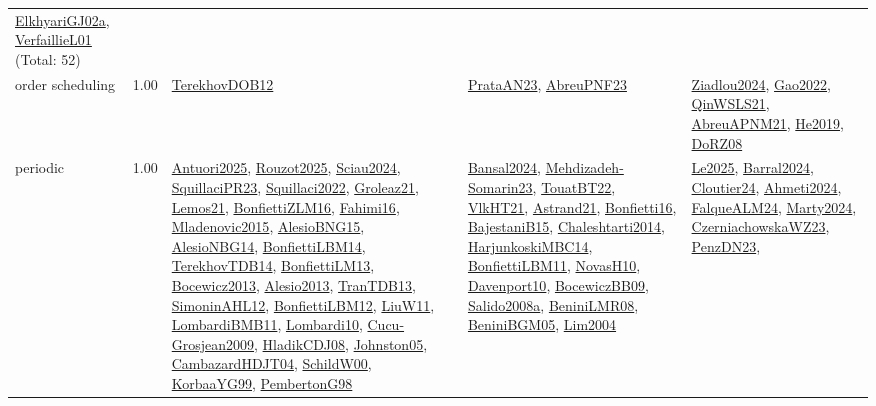 {\begin{longtable}{p{3cm}r>{\raggedright\arraybackslash}p{6cm}>{\raggedright\arraybackslash}p{6cm}>{\raggedright\arraybackslash}p{8cm}}
\hyperref[detail:ElkhyariGJ02a]{ElkhyariGJ02a}, \hyperref[detail:VerfaillieL01]{VerfaillieL01} (Total: 52)\\
\index{order scheduling}\index{Concepts!order scheduling}order scheduling &  1.00 & \hyperref[detail:TerekhovDOB12]{TerekhovDOB12} & \hyperref[detail:PrataAN23]{PrataAN23}, \hyperref[detail:AbreuPNF23]{AbreuPNF23} & \hyperref[detail:Ziadlou2024]{Ziadlou2024}, \hyperref[detail:Gao2022]{Gao2022}, \hyperref[detail:QinWSLS21]{QinWSLS21}, \hyperref[detail:AbreuAPNM21]{AbreuAPNM21}, \hyperref[detail:He2019]{He2019}, \hyperref[detail:DoRZ08]{DoRZ08}\\
\index{periodic}\index{Concepts!periodic}periodic &  1.00 & \hyperref[detail:Antuori2025]{Antuori2025}, \hyperref[detail:Rouzot2025]{Rouzot2025}, \hyperref[detail:Sciau2024]{Sciau2024}, \hyperref[detail:SquillaciPR23]{SquillaciPR23}, \hyperref[detail:Squillaci2022]{Squillaci2022}, \hyperref[detail:Groleaz21]{Groleaz21}, \hyperref[detail:Lemos21]{Lemos21}, \hyperref[detail:BonfiettiZLM16]{BonfiettiZLM16}, \hyperref[detail:Fahimi16]{Fahimi16}, \hyperref[detail:Mladenovic2015]{Mladenovic2015}, \hyperref[detail:AlesioBNG15]{AlesioBNG15}, \hyperref[detail:AlesioNBG14]{AlesioNBG14}, \hyperref[detail:BonfiettiLBM14]{BonfiettiLBM14}, \hyperref[detail:TerekhovTDB14]{TerekhovTDB14}, \hyperref[detail:BonfiettiLM13]{BonfiettiLM13}, \hyperref[detail:Bocewicz2013]{Bocewicz2013}, \hyperref[detail:Alesio2013]{Alesio2013}, \hyperref[detail:TranTDB13]{TranTDB13}, \hyperref[detail:SimoninAHL12]{SimoninAHL12}, \hyperref[detail:BonfiettiLBM12]{BonfiettiLBM12}, \hyperref[detail:LiuW11]{LiuW11}, \hyperref[detail:LombardiBMB11]{LombardiBMB11}, \hyperref[detail:Lombardi10]{Lombardi10}, \hyperref[detail:Cucu-Grosjean2009]{Cucu-Grosjean2009}, \hyperref[detail:HladikCDJ08]{HladikCDJ08}, \hyperref[detail:Johnston05]{Johnston05}, \hyperref[detail:CambazardHDJT04]{CambazardHDJT04}, \hyperref[detail:SchildW00]{SchildW00}, \hyperref[detail:KorbaaYG99]{KorbaaYG99}, \hyperref[detail:PembertonG98]{PembertonG98} & \hyperref[detail:Bansal2024]{Bansal2024}, \hyperref[detail:Mehdizadeh-Somarin23]{Mehdizadeh-Somarin23}, \hyperref[detail:TouatBT22]{TouatBT22}, \hyperref[detail:VlkHT21]{VlkHT21}, \hyperref[detail:Astrand21]{Astrand21}, \hyperref[detail:Bonfietti16]{Bonfietti16}, \hyperref[detail:BajestaniB15]{BajestaniB15}, \hyperref[detail:Chaleshtarti2014]{Chaleshtarti2014}, \hyperref[detail:HarjunkoskiMBC14]{HarjunkoskiMBC14}, \hyperref[detail:BonfiettiLBM11]{BonfiettiLBM11}, \hyperref[detail:NovasH10]{NovasH10}, \hyperref[detail:Davenport10]{Davenport10}, \hyperref[detail:BocewiczBB09]{BocewiczBB09}, \hyperref[detail:Salido2008a]{Salido2008a}, \hyperref[detail:BeniniLMR08]{BeniniLMR08}, \hyperref[detail:BeniniBGM05]{BeniniBGM05}, \hyperref[detail:Lim2004]{Lim2004} & \hyperref[detail:Le2025]{Le2025}, \hyperref[detail:Barral2024]{Barral2024}, \hyperref[detail:Cloutier24]{Cloutier24}, \hyperref[detail:Ahmeti2024]{Ahmeti2024}, \hyperref[detail:FalqueALM24]{FalqueALM24}, \hyperref[detail:Marty2024]{Marty2024}, \hyperref[detail:CzerniachowskaWZ23]{CzerniachowskaWZ23}, \hyperref[detail:PenzDN23]{PenzDN23}, 
\end{longtable}}
